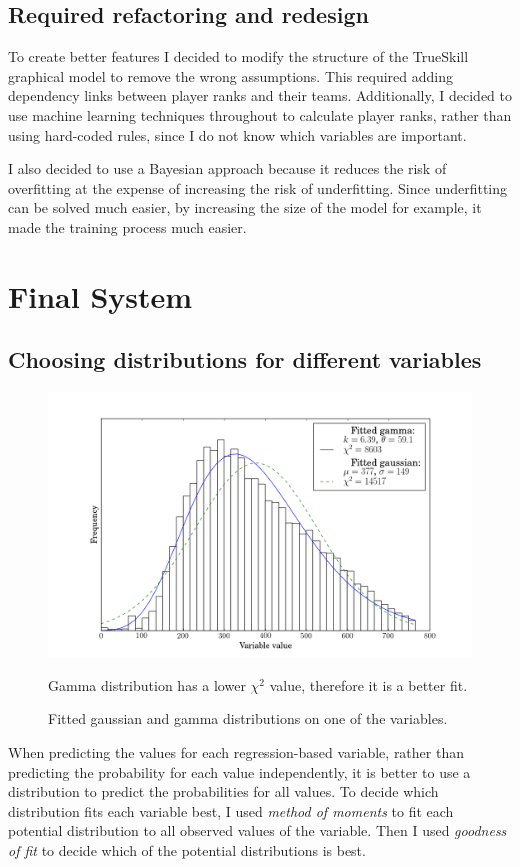 \documentclass[12pt,a4paper]{book}
\newcommand\note[1]{\vspace*{-0.5\baselineskip}\caption*{#1}}
\begin{document}
\subsection{Required refactoring and redesign}
To create better features I decided to modify the structure of the TrueSkill graphical model to remove the wrong assumptions.
This required adding dependency links between player ranks and their teams.
Additionally, I decided to use machine learning techniques throughout to calculate player ranks, rather than using hard-coded rules, since I do not know which variables are important.

I also decided to use a Bayesian approach because it reduces the risk of overfitting at the expense of increasing the risk of underfitting.
Since underfitting can be solved much easier, by increasing the size of the model for example, it made the training process much easier.
\section{Final System}
\subsection{Choosing distributions for different variables}
\begin{figure}[ht]
\centering
\includegraphics[scale=0.5]{fitted-distributions}
\caption{Fitted gaussian and gamma distributions on one of the variables.}
\note{Gamma distribution has a lower $\chi^2$ value, therefore it is a better fit.}
\label{fig:fitted-distributions}
\end{figure}
When predicting the values for each regression-based variable, rather than predicting the probability for each value independently, it is better to use a distribution to predict the probabilities for all values.
To decide which distribution fits each variable best, I used \emph{method of moments} to fit each potential distribution to all observed values of the variable.
Then I used \emph{goodness of fit} to decide which of the potential distributions is best.
\end{document}
